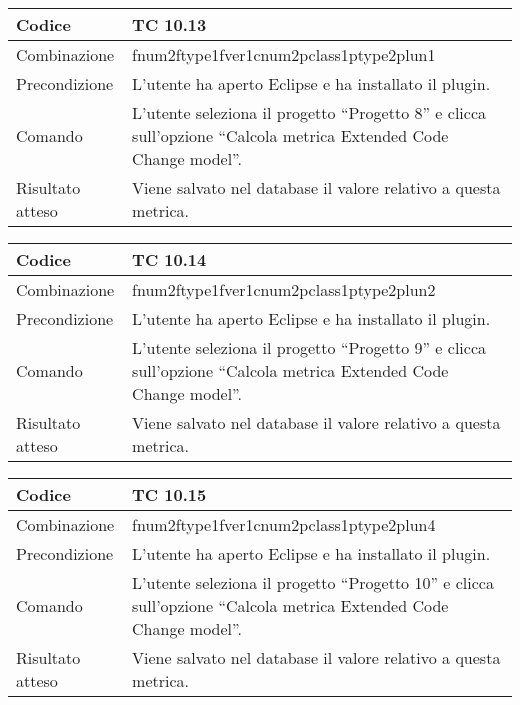 \clearpage

\begin{table}[ht]
\begin{tabular}{|p{3cm}|p{9cm}|}
\hline
\cellcolor{lightgray}Codice				& TC 10.13								\\
\hline
\cellcolor{lightgray}Combinazione		& fnum2ftype1fver1cnum2pclass1ptype2plun1									\\
\hline
\cellcolor{lightgray}Precondizione		& L'utente ha aperto Eclipse e ha installato il plugin.		\\
\hline
\cellcolor{lightgray}Comando			& L'utente seleziona il progetto ``Progetto 8''  e clicca sull'opzione ``Calcola metrica Extended Code Change model''.	\\
\hline
\cellcolor{lightgray}Risultato atteso	& Viene salvato nel database il valore relativo a questa metrica.\\
\hline
\end{tabular}
\end{table}

\begin{table}[ht]
\begin{tabular}{|p{3cm}|p{9cm}|}
\hline
\cellcolor{lightgray}Codice				& TC 10.14								\\
\hline
\cellcolor{lightgray}Combinazione		& fnum2ftype1fver1cnum2pclass1ptype2plun2									\\
\hline
\cellcolor{lightgray}Precondizione		& L'utente ha aperto Eclipse e ha installato il plugin.		\\
\hline
\cellcolor{lightgray}Comando			& L'utente seleziona il progetto ``Progetto 9''  e clicca sull'opzione ``Calcola metrica Extended Code Change model''.	\\
\hline
\cellcolor{lightgray}Risultato atteso	& Viene salvato nel database il valore relativo a questa metrica.\\
\hline
\end{tabular}
\end{table}

\begin{table}[ht]
\begin{tabular}{|p{3cm}|p{9cm}|}
\hline
\cellcolor{lightgray}Codice				& TC 10.15								\\
\hline
\cellcolor{lightgray}Combinazione		& fnum2ftype1fver1cnum2pclass1ptype2plun4									\\
\hline
\cellcolor{lightgray}Precondizione		& L'utente ha aperto Eclipse e ha installato il plugin.		\\
\hline
\cellcolor{lightgray}Comando			& L'utente seleziona il progetto ``Progetto 10''  e clicca sull'opzione ``Calcola metrica Extended Code Change model''.	\\
\hline
\cellcolor{lightgray}Risultato atteso	& Viene salvato nel database il valore relativo a questa metrica.\\
\hline
\end{tabular}
\end{table}

